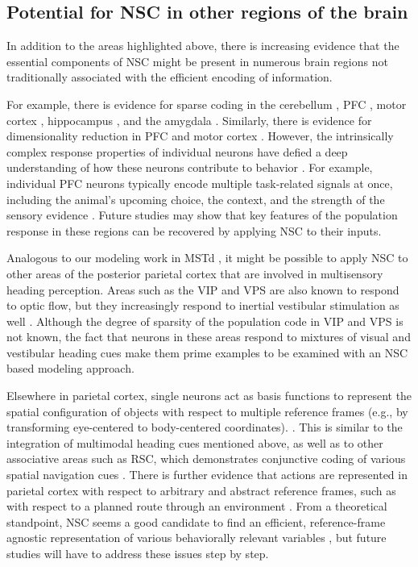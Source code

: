 \subsection*{Potential for NSC in other regions of the brain}

In addition to the areas highlighted above,
there is increasing evidence that the essential components of \ac{NSC}
might be present in numerous brain regions 
not traditionally associated with the efficient encoding of information.

For example, there is evidence for sparse coding in the
cerebellum \cite{Marr1969,Schweighofer2001,Brunel2004},
\ac{PFC} \cite{Abeles1990,Fujisawa2008,Wei2015},
motor cortex \cite{Beloozerova2003,Kakei2003,BarthPoulet2012,Brecht2004},
hippocampus \cite{rolls2013,ThompsonBest1989,Poli2017,Wixted2014},
and the amygdala \cite{Bach2011}.
Similarly, there is evidence for dimensionality reduction in
\ac{PFC} \cite{Mante2013}
and motor cortex \cite{Graziano2009,Gallego2017}.
However, the intrinsically complex response properties of individual neurons
have defied a deep understanding of how these neurons contribute to behavior
\cite{churchland2007,Mante2013}.
For example, individual \ac{PFC} neurons typically encode multiple task-related signals
at once, including the animal's upcoming choice, the context,
and the strength of the sensory evidence \cite{Mante2013,Rigotti2013,Kobak2016}.
Future studies may show that key features of the population response in these regions
can be recovered by applying \ac{NSC} to their inputs.

Analogous to our modeling work in \ac{MSTd} \cite{Beyeler2016},
it might be possible to apply \ac{NSC} to other areas of the posterior parietal
cortex that are involved in multisensory heading perception.
Areas such as the \ac{VIP} and \ac{VPS} are also known to respond to optic flow,
but they increasingly respond to inertial vestibular stimulation as well
\cite{Chen2011}.
Although the degree of sparsity of the population code in \ac{VIP} and \ac{VPS} is not known,
the fact that neurons in these areas respond to mixtures of visual and vestibular
heading cues make them prime examples 
to be examined with an \ac{NSC} based modeling approach.

Elsewhere in parietal cortex, single neurons act as basis functions 
to represent the spatial configuration of objects 
with respect to multiple reference frames
(e.g., by transforming eye-centered to body-centered coordinates).
\cite{Poggio1990,PougetSejnowski1997,PougetSnyder2000}.
This is similar to the integration of multimodal heading cues mentioned above,
as well as to other associative areas such as \ac{RSC},
which demonstrates conjunctive coding of various spatial navigation cues
\cite{AlexanderNitz2015,Rounds2018}.
There is further evidence that actions are represented in parietal cortex
with respect to arbitrary and abstract reference frames, 
such as with respect to a planned route through an environment \cite{nitz2009parietal}.
From a theoretical standpoint, \ac{NSC} seems a good candidate to find an efficient,
reference-frame agnostic representation of various behaviorally relevant variables
\cite{LouieGlimcher2012,louie2015adaptive,andersen1997multimodal,BenHamed2003},
but future studies will have to address these issues step by step.
